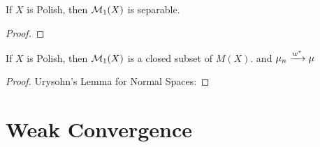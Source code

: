 \documentclass{book}
\begin{document}
	
	
	\begin{ex}
		If $X$ is Polish, then $\mathcal{M}_1(X)$ is separable. 
	\end{ex}
	
	\begin{proof}
	\end{proof}
	
	\begin{ex}
		If $X$ is Polish, then $\mathcal{M}_1(X)$ is a closed subset of $M(X)$. and $\mu_n \xrightarrow{w^*} \mu$
	\end{ex}
	\begin{proof}
		Urysohn's Lemma for Normal Spaces:
	\end{proof}
	
	
	
	
	
	
	
	
	
	
	
	
	
	
	
	
	
	
	
	
	
	
	
	
	
	
	
	
	
	
	
	
	
	
	
	
	
	
	
	
	
	
	
	
	
	
	
	
	
	
	
	
	
	
	
	
	
	
	
	
	
	
	
	
	
	
	
	
	
	
	
	
	\newpage	
	\section{Weak Convergence}
	
\end{document}

